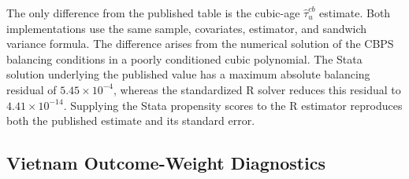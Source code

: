 \documentclass[12pt, a4paper, oneside]{article}
\theoremstyle{plain}
\theoremstyle{definition}
\begin{document}
The only difference from the published table is the cubic-age
\(\hat{\tau}_{u}^{cb}\) estimate. Both implementations use the same sample,
covariates, estimator, and sandwich variance formula. The difference arises
from the numerical solution of the CBPS balancing conditions in a poorly
conditioned cubic polynomial. The Stata solution underlying the published
value has a maximum absolute balancing residual of
\(5.45\times10^{-4}\), whereas the standardized R solver reduces this
residual to \(4.41\times10^{-14}\). Supplying the Stata propensity scores to
the R estimator reproduces both the published estimate and its standard
error. 





\newpage
\subsection{Vietnam Outcome-Weight Diagnostics}
\end{document}
